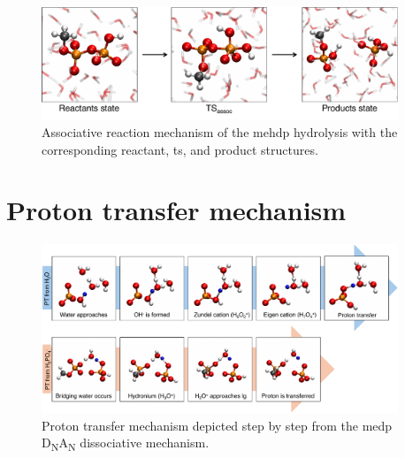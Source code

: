\begin{figure}[ht]
    \centering
    \includegraphics[width=0.95\textwidth]{Figures/4_Results/results_mehdp_mechanism.pdf}
    \caption{Associative reaction mechanism of the \ac{mehdp} hydrolysis with the corresponding reactant, \ac{ts}, and product structures.}
    \label{fig:mehdp_reaction_mechanism}
\end{figure}




\section{Proton transfer mechanism}

\begin{figure}[ht]
    \centering
    \includegraphics[width=0.95\textwidth]{Figures/4_Results/results_proton_transfer.pdf}
    \caption{Proton transfer mechanism depicted step by step from the \ac{medp} D\textsubscript{N}A\textsubscript{N} dissociative mechanism.}
    \label{fig:medp_proton_transfer}
\end{figure}
